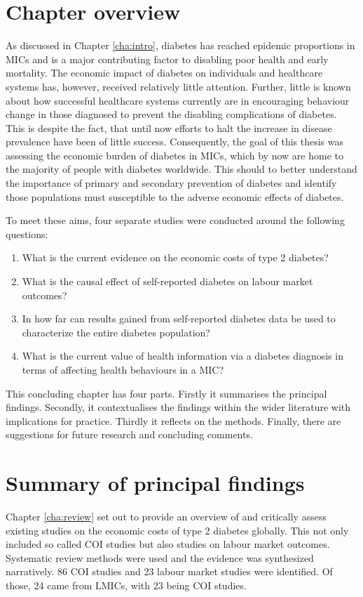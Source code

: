 \section{Chapter overview}
As discussed in Chapter \ref{cha:intro}, diabetes has reached epidemic proportions in \acp{MIC} and is a major contributing factor to disabling poor health and early mortality. The economic impact of diabetes on individuals and healthcare systems has, however, received relatively little attention. Further, little is known about how successful healthcare systems currently are in encouraging behaviour change in those diagnosed to prevent the disabling complications of diabetes. This is despite the fact, that until now efforts to halt the increase in disease prevalence have been of little success. Consequently, the goal of this thesis was assessing the economic burden of diabetes in \acp{MIC}, which by now are home to the majority of people with diabetes worldwide. This should to better understand the importance of primary and secondary prevention of diabetes and identify those populations must susceptible to the adverse economic effects of diabetes.

To meet these aims, four separate studies were conducted around the following questions:
\begin{enumerate}
\item What is the current evidence on the economic costs of type 2 diabetes?
\item What is the causal effect of self-reported diabetes on labour market outcomes?
\item In how far can results gained from self-reported diabetes data be used to characterize the entire diabetes population?
\item What is the current value of health information via a diabetes diagnosis in terms of affecting health behaviours in a \ac{MIC}?
\end{enumerate}

This concluding chapter has four parts. Firstly it summarises the principal findings. Secondly, it contextualises the findings within the wider literature with implications for practice. Thirdly it reflects on the methods. Finally, there are suggestions for future research and concluding comments.

\section{Summary of principal findings}

Chapter \ref{cha:review} set out to provide an overview of and critically assess existing studies on the economic costs of type 2 diabetes globally. This not only included so called \ac{COI} studies but also studies on labour market outcomes. Systematic review methods were used and the evidence was synthesized narratively. 86 \ac{COI} studies and 23 labour market studies were identified. Of those, 24 came from \acp{LMIC}, with 23 being \ac{COI} studies.

